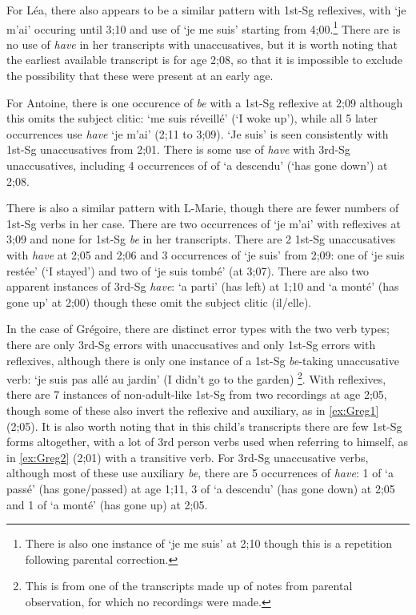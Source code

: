 \documentclass[
  12pt,
]{article}
\begin{document}
For Léa, there also appears to be a similar pattern with 1st-Sg reflexives, with `je m'ai' occuring until 3;10 and use of `je me suis' starting from 4;00.\footnote{There is also one instance of `je me suis' at 2;10 though this is a repetition following parental correction.} There are is no use of \emph{have} in her transcripts with unaccusatives, but it is worth noting that the earliest available transcript is for age 2;08, so that it is impossible to exclude the possibility that these were present at an early age.

For Antoine, there is one occurence of \emph{be} with a 1st-Sg reflexive at 2;09 although this omits the subject clitic: `me suis réveillé' (`I woke up'), while all 5 later occurrences use \emph{have} `je m'ai' (2;11 to 3;09). `Je suis' is seen consistently with 1st-Sg unaccusatives from 2;01. There is some use of \emph{have} with 3rd-Sg unaccusatives, including 4 occurrences of of `a descendu' (`has gone down') at 2;08.

There is also a similar pattern with L-Marie, though there are fewer numbers of 1st-Sg verbs in her case. There are two occurrences of `je m'ai' with reflexives at 3;09 and none for 1st-Sg \emph{be} in her transcripts. There are 2 1st-Sg unaccusatives with \emph{have} at 2;05 and 2;06 and 3 occurrences of `je suis' from 2;09: one of `je suis restée' (`I stayed') and two of `je suis tombé' (at 3;07). There are also two apparent instances of 3rd-Sg \emph{have}: `a parti' (has left) at 1;10 and `a monté' (has gone up' at 2;00) though these omit the subject clitic (il/elle).

In the case of Grégoire, there are distinct error types with the two verb types; there are only 3rd-Sg errors with unaccusatives and only 1st-Sg errors with reflexives, although there is only one instance of a 1st-Sg \emph{be}-taking unaccusative verb: `je suis pas allé au jardin' (I didn't go to the garden) \footnote{This is from one of the transcripts made up of notes from parental observation, for which no recordings were made.}. With reflexives, there are 7 instances of non-adult-like 1st-Sg from two recordings at age 2;05, though some of these also invert the reflexive and auxiliary, as in \ref{ex:Greg1} (2;05). It is also worth noting that in this child's transcripts there are few 1st-Sg forms altogether, with a lot of 3rd person verbs used when referring to himself, as in \ref{ex:Greg2} (2;01) with a transitive verb. For 3rd-Sg unaccusative verbs, although most of these use auxiliary \emph{be}, there are 5 occurrences of \emph{have}: 1 of `a passé' (has gone/passed) at age 1;11, 3 of `a descendu' (has gone down) at 2;05 and 1 of `a monté' (has gone up) at 2;05.
\end{document}

